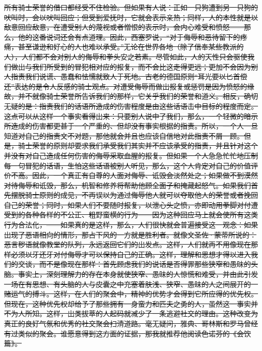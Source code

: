 \documentclass[12pt,oneside]{book}
\begin{document}
\sout{所有骑士荣誉的借口都经受不住检验。但如果有人说：正如一只狗遭到另一只狗的吠叫时，会以吠叫回应；但受到爱抚时，它就会表示亲热；同样，人的本性就是以敌意回应敌意，在遭受别人的蔑视或者憎恨的表示时，会内心难受和愤怒——那么，他的这番说词还会有点道理。因此，西塞罗说，“对于侮辱和恶待留下的疼痛，甚至谦逊和好心的人也难以承受。”无论在世界各地（除了信奉某些教派的人），人们都不会对别人的侮辱和拳头安之若素。尽管如此，人的天性只会驱使我们做出与我们所受到的冒犯相对应的报复，而不会比这走得更远；更加不会因为别人指责我们说谎、愚蠢和怯懦就致人于死地。古老的德国原则“耳光要以匕首偿还”表达的是令人反感的骑士观点。对遭受侮辱而做出报复或惩罚是因为愤怒的缘故，并不就像骑士荣誉所告诉我们的那样，它关乎我们的荣誉和道义。相反，确切无疑的是：指责我们的话语所造成的伤害程度是由这些话语击中目标的程度而定。这点可以从这样一个事实看得出来：只要别人说中了我们，那么，一个轻微的暗示所造成的伤害都更甚于一个严重的、但却没有事实根据的指责。所以，一个人一旦知道对自己的指责文不对题，那他就会并且也应该自信地对此指责不屑一顾。但是，骑士荣誉的原则却要求我们承受我们其实并不应该承受的指责，并且针对这个并没有对自己造成任何伤害的侮辱采取血腥的报复。但如果一个人急急忙忙地压制每一句冒犯的话语，生怕这些话语被别人听见，那么，这个人肯定对自己的价值评价不高。因此，一个真正有自尊的人面对侮辱、诋毁会淡然处之；如果做不到漠然对待侮辱和诋毁，那么，机智和修养将帮助他顾全面子和掩藏起怒气。如果我们首先摆脱骑士原则的成见，不再误以为通过侮辱他人就可以夺取他人的荣誉或者挽回自己的荣誉；同时，如果人们不要随时报复，以泄心头之愤，亦即动用拳脚对付遭受到的各种各样的不公正、粗野蛮横的行为——因为这种回应马上就会使所有这类行为合法化，——如果真的是这样，那么，人们很快就会普遍接受这一观念：如果出现了恶语相向的情形，那占下风的一方就是胜利者。就像文圣佐·蒙蒂所说的：恶言秽语就像教堂的队列，永远返回它们的出发点。这样，人们就再不用像现在那样必须以牙还牙对付侮辱才可以保持自己的正确。这样，理解和思想才得以进入我们的交谈，而不是像现在那样：首先顾虑我们的说话是否得罪那些狭窄和愚昧的头脑。事实上，深刻理解力的存在本身就使狭窄、愚昧的人惊慌和难受，并由此引发一场在有思想、有头脑的人与皮囊之中充塞着肤浅、狭窄、愚昧的人之间展开的一赌运气的搏斗。这样，在人们的聚会中，精神的优势才会得到它所应得的优先权。但现在，这种优先权却给予了那些拥有一身蛮力和匹夫之勇的人，虽然这一事实并不为人所知。这样，出类拔萃的人起码就减少了一条逃避社交的理由。这种改变为真正的良好气氛和优秀的社交聚会扫清道路。毫无疑问，雅典、哥林斯和罗马曾经有过类似的聚会。谁愿意得到这方面的证据，那我就推荐他阅读色诺芬的《会饮篇》。 }
\end{document}
